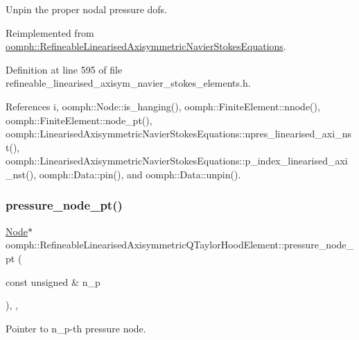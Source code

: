 Unpin the proper nodal pressure dofs. 



Reimplemented from \hyperlink{classoomph_1_1RefineableLinearisedAxisymmetricNavierStokesEquations_ae38c5e1d9851e7b3198443cde943620f}{oomph\+::\+Refineable\+Linearised\+Axisymmetric\+Navier\+Stokes\+Equations}.



Definition at line 595 of file refineable\+\_\+linearised\+\_\+axisym\+\_\+navier\+\_\+stokes\+\_\+elements.\+h.



References i, oomph\+::\+Node\+::is\+\_\+hanging(), oomph\+::\+Finite\+Element\+::nnode(), oomph\+::\+Finite\+Element\+::node\+\_\+pt(), oomph\+::\+Linearised\+Axisymmetric\+Navier\+Stokes\+Equations\+::npres\+\_\+linearised\+\_\+axi\+\_\+nst(), oomph\+::\+Linearised\+Axisymmetric\+Navier\+Stokes\+Equations\+::p\+\_\+index\+\_\+linearised\+\_\+axi\+\_\+nst(), oomph\+::\+Data\+::pin(), and oomph\+::\+Data\+::unpin().

\mbox{\label{classoomph_1_1RefineableLinearisedAxisymmetricQTaylorHoodElement_a88e21349662f0584dc329ac7260ddf6d}} 
\subsubsection{\texorpdfstring{pressure\+\_\+node\+\_\+pt()}{pressure\_node\_pt()}}
{\footnotesize\ttfamily \hyperlink{classoomph_1_1Node}{Node}$\ast$ oomph\+::\+Refineable\+Linearised\+Axisymmetric\+Q\+Taylor\+Hood\+Element\+::pressure\+\_\+node\+\_\+pt (\begin{DoxyParamCaption}\item[{const unsigned \&}]{n\+\_\+p }\end{DoxyParamCaption})\hspace{0.3cm}{\ttfamily [inline]}, {\ttfamily [private]}, {\ttfamily [virtual]}}



Pointer to n\+\_\+p-\/th pressure node. 



